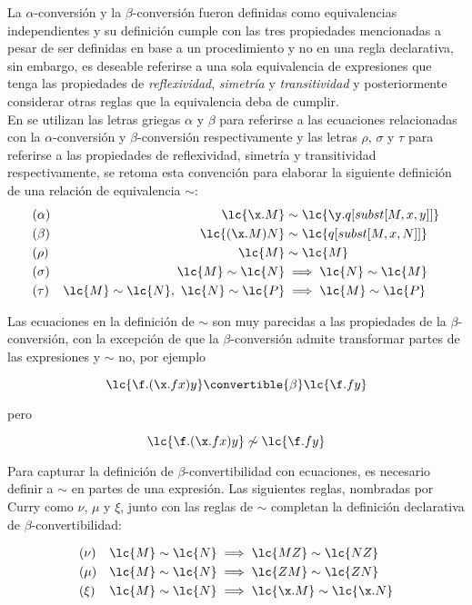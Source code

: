 La \(\alpha\)-conversión y la \(\beta\)-conversión fueron definidas como
equivalencias independientes y su definición cumple con las tres propiedades
mencionadas a pesar de ser definidas en base a un procedimiento y no en una
regla declarativa, sin embargo, es deseable referirse a una sola equivalencia de
expresiones que tenga las propiedades de \emph{reflexividad}, \emph{simetría} y
\emph{transitividad} y posteriormente considerar otras reglas que la equivalencia
deba de cumplir. \\

En \cite{Curry:CombinatoryLogicI} se utilizan las letras griegas \(\alpha\) y
\(\beta\) para referirse a las ecuaciones relacionadas con la
\(\alpha\)-conversión y \(\beta\)-conversión respectivamente y las letras
\(\rho\), \(\sigma\) y \(\tau\) para referirse a las propiedades de
reflexividad, simetría y transitividad respectivamente, se retoma esta convención
para elaborar la siguiente definición de una relación de equivalencia \(\sim\): \\

\begin{align*}
  &(\alpha) &\lc{\x.M} &\sim \lc{\y.q[subst[M,x,y]]} \\
  &(\beta)  &\lc{(\x.M)N} &\sim \lc{q[subst[M,x,N]]} \\
  &(\rho)   &\lc{M} &\sim \lc{M} \\
  &(\sigma) &\lc{M} \sim \lc{N} &\implies \lc{N} \sim \lc{M}\\
  &(\tau)   &\lc{M} \sim \lc{N},\ \lc{N} \sim \lc{P} &\implies \lc{M} \sim \lc{P}
\end{align*}

Las ecuaciones en la definición de \(\sim\) son muy parecidas a las propiedades
de la \(\beta\)-conversión, con la excepción de que la \(\beta\)-conversión
admite transformar partes de las expresiones y \(\sim\) no, por ejemplo

\[\lc{\f.(\x.f x)y} \convertible{\beta} \lc{\f.f y}\]

pero

\[\lc{\f.(\x.f x)y} \not\sim \lc{\f.f y}\]

Para capturar la definición de \(\beta\)-convertibilidad con ecuaciones, es
necesario definir a \(\sim\) en partes de una expresión. Las siguientes reglas,
nombradas por Curry como \(\nu\), \(\mu\) y \(\xi\), junto con las reglas de
\(\sim\) completan la definición declarativa de \(\beta\)-convertibilidad:

\begin{align*}
  &(\nu)  &\lc{M} \sim \lc{N} &\implies \lc{M Z} \sim \lc{N Z} \\
  &(\mu)  &\lc{M} \sim \lc{N} &\implies \lc{Z M} \sim \lc{Z N} \\
  &(\xi)  &\lc{M} \sim \lc{N} &\implies \lc{\x.M} \sim \lc{\x.N}
\end{align*}

